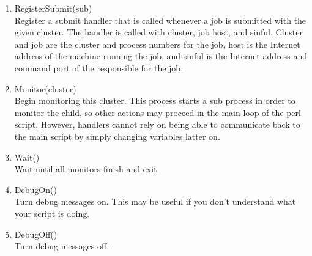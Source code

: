 \begin{enumerate}
	\item RegisterSubmit(sub) \\
	Register a submit handler that is called whenever a job is submitted
	with the given cluster.  The handler is called with cluster, job 
	host, and sinful. Cluster and job are the cluster and
	process numbers for the job, host is the Internet address of the
	machine running the job, and sinful is the Internet address and
	command port of the  responsible for the job.

	\item Monitor(cluster) \\
	Begin monitoring this cluster.  This process starts a sub process
	in order to monitor the child, so other actions may proceed in the
	main loop of the perl script.  However, handlers cannot rely on
	being able to communicate back to the main script by simply changing
	variables latter on.
	
	\item Wait() \\
	Wait until all monitors finish and exit.

	\item DebugOn() \\
	Turn debug messages on.  This may be useful if you don't understand
	what your script is doing.	

	\item DebugOff() \\
	Turn debug messages off.

\end{enumerate}

